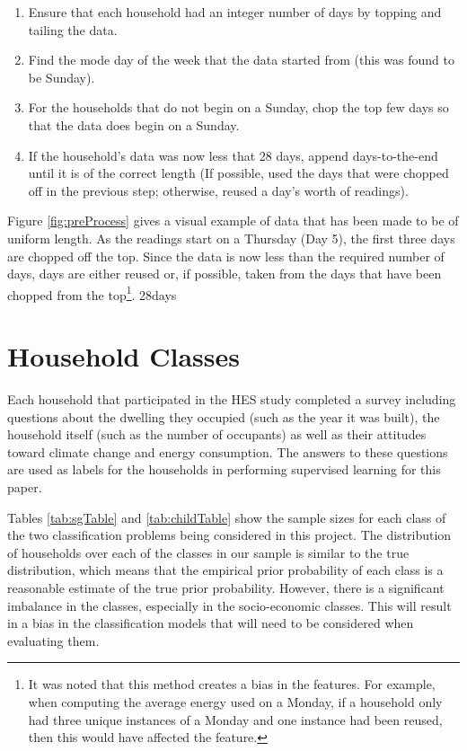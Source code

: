 \begin{enumerate}
\item Ensure that each household had an integer number of days by topping and tailing the data.
\item Find the mode day of the week that the data started from (this was found to be Sunday).
\item For the households that do not begin on a Sunday, chop the top few days so that the data does begin on a Sunday.
\item If the household's data was now less that 28 days, append days-to-the-end until it is of the correct length (If possible, used the days that were chopped off in the previous step; otherwise, reused a day's worth of readings).
\end{enumerate}

Figure \ref{fig:preProcess} gives a visual example of data that has been made to be of uniform length. As the readings start on a Thursday (Day 5), the first three days are chopped off the top. Since the data is now less than the required number of days, days are either reused or, if possible, taken from the days that have been chopped from the top\footnote{It was noted that this method creates a bias in the features. For example, when computing the average energy used on a Monday, if a household only had three unique instances of a Monday and one instance had been reused, then this would have affected the feature.}.
\to28days

\section{Household Classes}

Each household that participated in the HES study completed a survey including questions about the dwelling they occupied (such as the year it was built), the household itself (such as the number of occupants) as well as their attitudes toward climate change and energy consumption. The answers to these questions are used as labels for the households in performing supervised learning for this paper.

\sgTable

Tables \ref{tab:sgTable} and \ref{tab:childTable} show the sample sizes for each class of the two classification problems being considered in this project. The distribution of households over each of the classes in our sample is similar to the true distribution, which means that the empirical prior probability of each class is a reasonable estimate of the true prior probability. However, there is a significant imbalance in the classes, especially in the socio-economic classes. This will result in a bias in the classification models that will need to be considered when evaluating them.
\childTable

